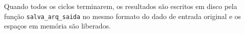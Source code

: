 Quando todos os ciclos terminarem, os resultados são escritos em disco pela função \linebreak \texttt{salva\_arq\_saida} no mesmo formato do dado de entrada original e os espaços em memória são liberados.



